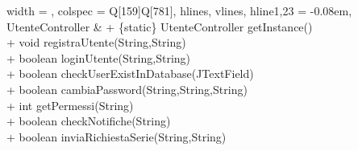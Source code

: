 \begin{longtblr}[
    label = none,
    entry = none,
  ]{
    width = \linewidth,
    colspec = {Q[159]Q[781]},
    hlines,
    vlines,
    hline{1,23} = {-}{0.08em},
  }
  UtenteController       & {+ \{static\} UtenteController getInstance()\\+ void registraUtente(String,String)\\+ boolean loginUtente(String,String)\\+ boolean checkUserExistInDatabase(JTextField)\\+ boolean cambiaPassword(String,String,String)\\+ int getPermessi(String)\\+ boolean checkNotifiche(String)\\+ boolean inviaRichiestaSerie(String,String)}                                                                                                                                                                                                                                                                                                                                                                                                                                                                                                                                                                                                                                                                                                                                                                                                                                                                                                                                                                                                                                                                                                                                                                                                                                                                                                                                                                                                                                                                                                                                                            \\                                                                                                                                                                                                                                                                                                                                                                                                                                                                                                                                                                                                                                                                                                                                                                                                                                                                                                                                                                               
\end{longtblr}
